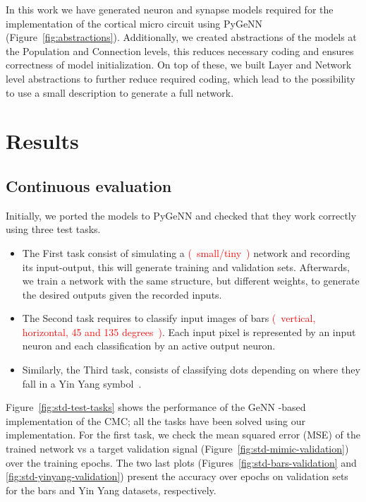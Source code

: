 \documentclass{article}
\newcommand{\pygenn}{{PyGeNN }}
\newcommand{\genn}{{GeNN }}
\newcommand\note[1]{\textcolor{red}{(~#1~)}}
\begin{document}
In this work we have generated neuron and synapse models required for the implementation of the cortical micro circuit using \pygenn (Figure~\ref{fig:abstractions}). 
Additionally, we created abstractions of the models at the Population and Connection levels, this reduces necessary coding and ensures correctness of model initialization. 
On top of these, we built Layer and Network level abstractions to further reduce required coding, which lead to the possibility to use a small description to generate a full network.

\section{Results}
\subsection{Continuous evaluation}

Initially, we ported the models to \pygenn and checked that they work correctly using three test tasks.
\begin{itemize}
    \item {The First task consist of simulating a \note{small/tiny} network and recording its input-output, this will generate training and validation sets.
    Afterwards, we train a network with the same structure, but different weights, to generate the desired outputs given the recorded inputs.}
    \item {The Second task requires to classify input images of bars \note{vertical, horizontal, 45 and 135 degrees}. 
    Each input pixel is represented by an input neuron and each classification by an active output neuron.}
    \item {Similarly, the Third task, consists of classifying dots depending on where they fall in a Yin Yang symbol~\cite{yinyang_dataset}.}
\end{itemize}

Figure~\ref{fig:std-test-tasks} shows the performance of the \genn-based implementation of the CMC; all the tasks have been solved using our implementation.
For the first task, we check the mean squared error (MSE) of the trained network vs a target validation signal (Figure~\ref{fig:std-mimic-validation}) over the training epochs.
The two last plots (Figures~\ref{fig:std-bars-validation} and \ref{fig:std-yinyang-validation}) present the accuracy over epochs on validation sets for the bars and Yin Yang datasets, respectively.
\end{document}
